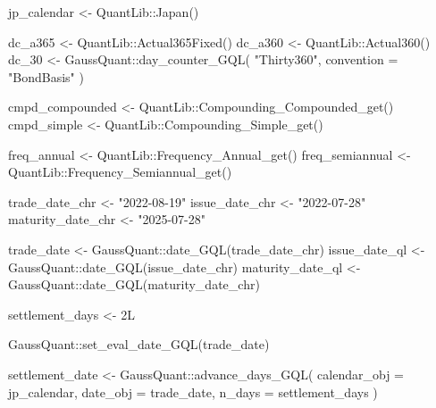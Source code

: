 \documentclass[
  letterpaper,
  DIV=11,
  numbers=noendperiod]{scrreprt}
\newenvironment{Shaded}{\begin{snugshade}}{\end{snugshade}}
\newcommand{\AttributeTok}[1]{\textcolor[rgb]{0.40,0.45,0.13}{#1}}
\newcommand{\DecValTok}[1]{\textcolor[rgb]{0.68,0.00,0.00}{#1}}
\newcommand{\FunctionTok}[1]{\textcolor[rgb]{0.28,0.35,0.67}{#1}}
\newcommand{\NormalTok}[1]{\textcolor[rgb]{0.00,0.23,0.31}{#1}}
\newcommand{\OtherTok}[1]{\textcolor[rgb]{0.00,0.23,0.31}{#1}}
\newcommand{\SpecialCharTok}[1]{\textcolor[rgb]{0.37,0.37,0.37}{#1}}
\newcommand{\StringTok}[1]{\textcolor[rgb]{0.13,0.47,0.30}{#1}}
\begin{document}
\begin{Shaded}
\begin{Highlighting}[]
\NormalTok{jp\_calendar }\OtherTok{\textless{}{-}}\NormalTok{ QuantLib}\SpecialCharTok{::}\FunctionTok{Japan}\NormalTok{()}

\NormalTok{dc\_a365 }\OtherTok{\textless{}{-}}\NormalTok{ QuantLib}\SpecialCharTok{::}\FunctionTok{Actual365Fixed}\NormalTok{()}
\NormalTok{dc\_a360 }\OtherTok{\textless{}{-}}\NormalTok{ QuantLib}\SpecialCharTok{::}\FunctionTok{Actual360}\NormalTok{()}
\NormalTok{dc\_30 }\OtherTok{\textless{}{-}}\NormalTok{ GaussQuant}\SpecialCharTok{::}\FunctionTok{day\_counter\_GQL}\NormalTok{(}
  \StringTok{"Thirty360"}\NormalTok{,}
  \AttributeTok{convention =} \StringTok{"BondBasis"}
\NormalTok{)}

\NormalTok{cmpd\_compounded }\OtherTok{\textless{}{-}}\NormalTok{ QuantLib}\SpecialCharTok{::}\FunctionTok{Compounding\_Compounded\_get}\NormalTok{()}
\NormalTok{cmpd\_simple }\OtherTok{\textless{}{-}}\NormalTok{ QuantLib}\SpecialCharTok{::}\FunctionTok{Compounding\_Simple\_get}\NormalTok{()}

\NormalTok{freq\_annual }\OtherTok{\textless{}{-}}\NormalTok{ QuantLib}\SpecialCharTok{::}\FunctionTok{Frequency\_Annual\_get}\NormalTok{()}
\NormalTok{freq\_semiannual }\OtherTok{\textless{}{-}}\NormalTok{ QuantLib}\SpecialCharTok{::}\FunctionTok{Frequency\_Semiannual\_get}\NormalTok{()}

\NormalTok{trade\_date\_chr }\OtherTok{\textless{}{-}} \StringTok{"2022{-}08{-}19"}
\NormalTok{issue\_date\_chr }\OtherTok{\textless{}{-}} \StringTok{"2022{-}07{-}28"}
\NormalTok{maturity\_date\_chr }\OtherTok{\textless{}{-}} \StringTok{"2025{-}07{-}28"}

\NormalTok{trade\_date }\OtherTok{\textless{}{-}}\NormalTok{ GaussQuant}\SpecialCharTok{::}\FunctionTok{date\_GQL}\NormalTok{(trade\_date\_chr)}
\NormalTok{issue\_date\_ql }\OtherTok{\textless{}{-}}\NormalTok{ GaussQuant}\SpecialCharTok{::}\FunctionTok{date\_GQL}\NormalTok{(issue\_date\_chr)}
\NormalTok{maturity\_date\_ql }\OtherTok{\textless{}{-}}\NormalTok{ GaussQuant}\SpecialCharTok{::}\FunctionTok{date\_GQL}\NormalTok{(maturity\_date\_chr)}

\NormalTok{settlement\_days }\OtherTok{\textless{}{-}} \DecValTok{2}\NormalTok{L}

\NormalTok{GaussQuant}\SpecialCharTok{::}\FunctionTok{set\_eval\_date\_GQL}\NormalTok{(trade\_date)}

\NormalTok{settlement\_date }\OtherTok{\textless{}{-}}\NormalTok{ GaussQuant}\SpecialCharTok{::}\FunctionTok{advance\_days\_GQL}\NormalTok{(}
  \AttributeTok{calendar\_obj =}\NormalTok{ jp\_calendar,}
  \AttributeTok{date\_obj =}\NormalTok{ trade\_date,}
  \AttributeTok{n\_days =}\NormalTok{ settlement\_days}
\NormalTok{)}


\end{Highlighting}
\end{Shaded}
\end{document}
